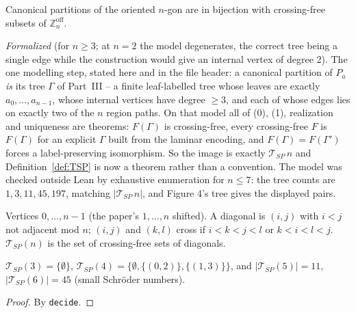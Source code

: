 \begin{lemma}\label{lem:3.2}
  \leanok{}
  Canonical partitions of the oriented $n$-gon are in
  bijection with crossing-free subsets of $\mathbb{Z}_n^{\mathrm{off}}$.

  \emph{Formalized} (for $n\ge3$; at $n=2$ the model degenerates, the correct tree being a single
  edge while the construction would give an internal vertex of degree 2).  The one modelling step, stated here and in the file header: a
  canonical partition of $P_a$ \emph{is} its tree $\Gamma$ of Part~III -- a finite leaf-labelled
  tree whose leaves are exactly $a_0,\dots,a_{n-1}$, whose internal vertices have degree $\ge3$,
  and each of whose edges lies on exactly two of the $n$ region paths.  On that model all of
  (0), (1), realization and uniqueness are theorems: $F(\Gamma)$ is crossing-free, every
  crossing-free $F$ is $F(\Gamma)$ for an explicit $\Gamma$ built from the laminar encoding, and
  $F(\Gamma)=F(\Gamma')$ forces a label-preserving isomorphism.  So the image is exactly
  $\mathcal{T}_{SP}\,n$ and Definition~\ref{def:TSP} is now a theorem rather than a convention.
  The model was checked outside Lean by exhaustive enumeration for $n\le7$: the tree counts are
  $1,3,11,45,197$, matching $|\mathcal{T}_{SP}\,n|$, and Figure 4's tree gives the displayed pairs.
\end{lemma}

\begin{definition}\label{def:TSP}
  \leanok
  Vertices $0,\dots,n-1$ (the paper's $1,\dots,n$ shifted).  A diagonal is $(i,j)$ with
  $i<j$ not adjacent mod $n$; $(i,j)$ and $(k,l)$ cross if $i<k<j<l$ or $k<i<l<j$.
  $\mathcal{T}_{SP}(n)$ is the set of crossing-free sets of diagonals.
\end{definition}

\begin{lemma}\label{lem:TSP-small}
  \leanok
  $\mathcal{T}_{SP}(3)=\{\emptyset\}$, $\mathcal{T}_{SP}(4)=\{\emptyset,\{(0,2)\},\{(1,3)\}\}$,
  and $|\mathcal{T}_{SP}(5)|=11$, $|\mathcal{T}_{SP}(6)|=45$ (small Schr\"oder numbers).
\end{lemma}
\begin{proof}\leanok
  By \texttt{decide}.
\end{proof}

